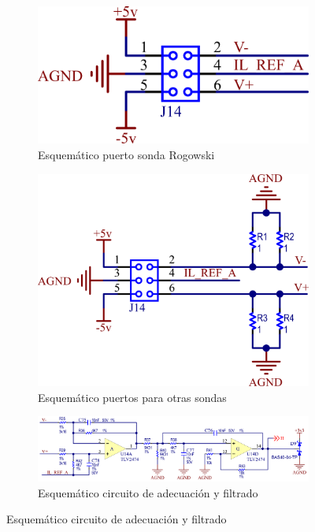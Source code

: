 \documentclass[../et.tex]{subfiles}
\begin{document}
\begin{figure}[!htbp]
  \centering
  \begin{subfigure}[b]{0.25\textwidth}
    \centering
    \includegraphics[width=\textwidth]{../images/puertos-sondas}
    \caption{Esquemático puerto sonda Rogowski}
    \label{fig:puertos-sondas}
    \vspace*{10mm}
  \end{subfigure}
  \hspace{0.2\textwidth}
  \begin{subfigure}[b]{0.3\textwidth}
    \centering
    \includegraphics[width=\textwidth]{../images/puertos-sondas-con-resistencias}
    \caption{Esquemático puertos para otras sondas}
    \label{fig:puertos-sondas-con-resistencias}
    \vspace*{10mm}
  \end{subfigure}

  \begin{subfigure}[b]{0.9\textwidth}
    \centering
    \includegraphics[width=\textwidth]{../images/puertos-adecuacion.png}
    \caption{Esquemático circuito de adecuación y filtrado}
    \label{fig:puertos-adecuacion}
    \vspace*{5mm}
  \end{subfigure}


\end{figure}
\end{document}

